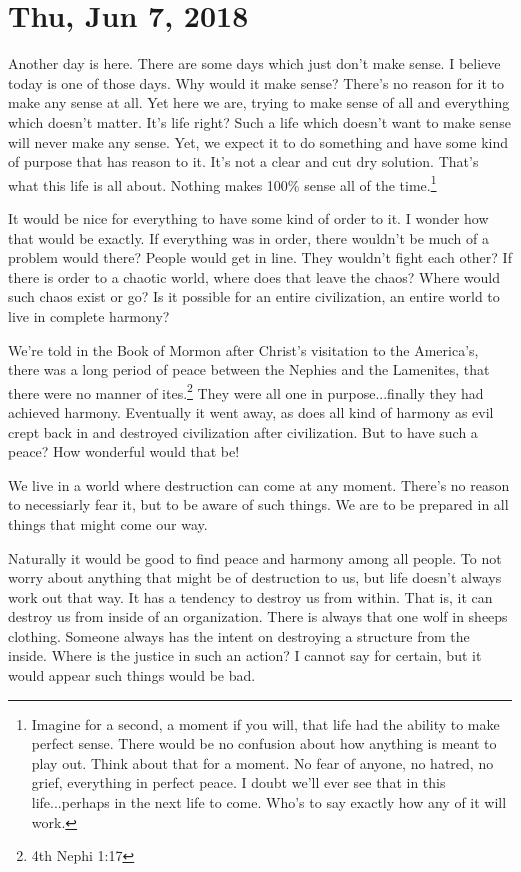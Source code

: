 \section{Thu, Jun 7, 2018}

Another day is here. There are some days which just don't make sense. I believe
today is one of those days. Why would it make sense? There's no reason for it to
make any sense at all. Yet here we are, trying to make sense of all and
everything which doesn't matter. It's life right? Such a life which doesn't want
to make sense will never make any sense. Yet, we expect it to do something and
have some kind of purpose that has reason to it. It's not a clear and cut dry
solution. That's what this life is all about. Nothing makes 100\% sense all of
the time.\footnote{Imagine for a second, a moment if you will, that life had
the ability to make perfect sense. There would be no confusion about how 
anything is meant to play out. Think about that for a moment. No fear of anyone,
no hatred, no grief, everything in perfect peace. I doubt we'll ever see that
in this life...perhaps in the next life to come. Who's to say exactly how any
of it will work.}

It would be nice for everything to have some kind of order to it. I wonder how
that would be exactly. If everything was in order, there wouldn't be much of a
problem would there? People would get in line. They wouldn't fight each other?
If there is order to a chaotic world, where does that leave the chaos? Where
would such chaos exist or go? Is it possible for an entire civilization, an
entire world to live in complete harmony?

We're told in the Book of Mormon after Christ's visitation to the America's,
there was a long period of peace between the Nephies and the Lamenites, that
there were no manner of ites.\footnote{4th Nephi 1:17} They were all one in 
purpose...finally they had achieved harmony. Eventually it went away, as does 
all kind of harmony as evil crept back in and destroyed civilization after 
civilization. But to have such a peace? How wonderful would that be!

We live in a world where destruction can come at any moment. There's no reason
to necessiarly fear it, but to be aware of such things. We are to be prepared in
all things that might come our way.

Naturally it would be good to find peace and harmony among all people. To not
worry about anything that might be of destruction to us, but life doesn't always
work out that way. It has a tendency to destroy us from within. That is, it can
destroy us from inside of an organization. There is always that one wolf in
sheeps clothing. Someone always has the intent on destroying a structure from 
the inside. Where is the justice in such an action? I cannot say for certain,
but it would appear such things would be bad.